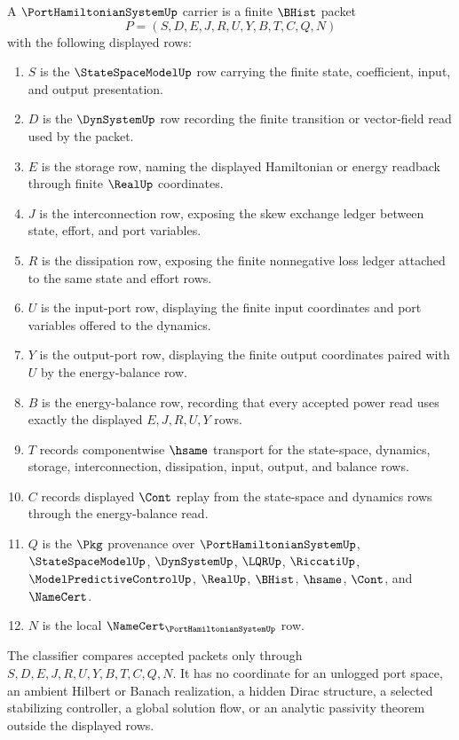 \begin{definition}
\label{def:port-hamiltonian-system-carrier}
A $\PortHamiltonianSystemUp$ carrier is a finite $\BHist$ packet
$$
P=(S,D,E,J,R,U,Y,B,T,C,Q,N)
$$
with the following displayed rows:
\begin{enumerate}
\item $S$ is the $\StateSpaceModelUp$ row carrying the finite state, coefficient, input, and output presentation.
\item $D$ is the $\DynSystemUp$ row recording the finite transition or vector-field read used by the packet.
\item $E$ is the storage row, naming the displayed Hamiltonian or energy readback through finite $\RealUp$ coordinates.
\item $J$ is the interconnection row, exposing the skew exchange ledger between state, effort, and port variables.
\item $R$ is the dissipation row, exposing the finite nonnegative loss ledger attached to the same state and effort rows.
\item $U$ is the input-port row, displaying the finite input coordinates and port variables offered to the dynamics.
\item $Y$ is the output-port row, displaying the finite output coordinates paired with $U$ by the energy-balance row.
\item $B$ is the energy-balance row, recording that every accepted power read uses exactly the displayed $E,J,R,U,Y$ rows.
\item $T$ records componentwise $\hsame$ transport for the state-space, dynamics, storage, interconnection, dissipation, input, output, and balance rows.
\item $C$ records displayed $\Cont$ replay from the state-space and dynamics rows through the energy-balance read.
\item $Q$ is the $\Pkg$ provenance over $\PortHamiltonianSystemUp$, $\StateSpaceModelUp$, $\DynSystemUp$, $\LQRUp$, $\RiccatiUp$, $\ModelPredictiveControlUp$, $\RealUp$, $\BHist$, $\hsame$, $\Cont$, and $\NameCert$.
\item $N$ is the local $\NameCert_{\PortHamiltonianSystemUp}$ row.
\end{enumerate}
The classifier compares accepted packets only through $S,D,E,J,R,U,Y,B,T,C,Q,N$. It has no coordinate for an unlogged port space, an ambient Hilbert or Banach realization, a hidden Dirac structure, a selected stabilizing controller, a global solution flow, or an analytic passivity theorem outside the displayed rows.
\end{definition}

